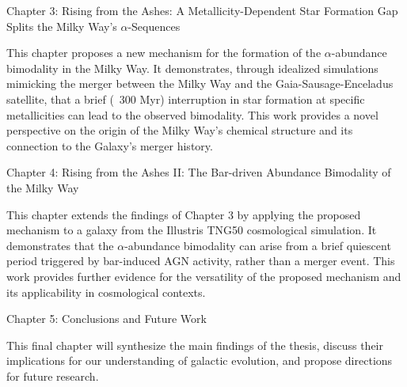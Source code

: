 Chapter 3: Rising from the Ashes: A Metallicity-Dependent Star Formation Gap Splits the Milky Way's $\alpha$-Sequences

This chapter proposes a new mechanism for the formation of the $\alpha$-abundance bimodality in the Milky Way. It demonstrates, through idealized simulations mimicking the merger between the Milky Way and the Gaia-Sausage-Enceladus satellite, that a brief (~300 Myr) interruption in star formation at specific metallicities can lead to the observed bimodality. This work provides a novel perspective on the origin of the Milky Way's chemical structure and its connection to the Galaxy's merger history.

Chapter 4: Rising from the Ashes II: The Bar-driven Abundance Bimodality of the Milky Way

This chapter extends the findings of Chapter 3 by applying the proposed mechanism to a galaxy from the Illustris TNG50 cosmological simulation. It demonstrates that the $\alpha$-abundance bimodality can arise from a brief quiescent period triggered by bar-induced AGN activity, rather than a merger event. This work provides further evidence for the versatility of the proposed mechanism and its applicability in cosmological contexts.

Chapter 5: Conclusions and Future Work

This final chapter will synthesize the main findings of the thesis, discuss their implications for our understanding of galactic evolution, and propose directions for future research.